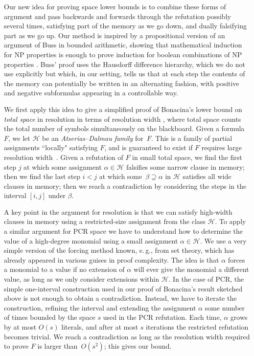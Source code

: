 \documentclass[11pt]{article}
\numberwithin{equation}{section}
\theoremstyle{definition}
\theoremstyle{plain}
\newcommand{\eg}{e.\,g.}
\newcommand\calH{\mathcal{H}}
\begin{document}
Our new idea for proving space lower bounds is to combine 
these forms of argument and
pass backwards and forwards through the refutation possibly several 
times, 
satisfying part of the memory as we go down, and dually falsifying part as we go up.  
Our method is inspired by a propositional version of  an argument of Buss in bounded arithmetic,
showing that mathematical induction for NP properties is enough  to prove induction for boolean combinations of 
NP properties \cite[Corollary~4]{Buss90}. Buss' proof uses the Hausdorff difference hierarchy, 
which we do not use explicitly but which, in our setting, tells us that at each step the contents
of the memory can potentially be written in an alternating fashion, with positive and negative
subformulas appearing in a controllable way.

We first apply this idea to give a simplified proof of Bonacina's lower bound on \emph{total space} 
in resolution in terms of resolution width
\cite{DBLP:conf/icalp/Bonacina16,DBLP:journals/siamcomp/BonacinaGT16},
where total space counts the total number of symbols simultaneously on the blackboard.
Given a formula $F$, we let $\calH$ be
an \emph{Atserias--Dalmau family} for~$F$. 
This is a family of partial assignments ``locally" satisfying $F$, 
and is guaranteed to exist if $F$ requires large resolution width~\cite{DBLP:journals/jcss/AtseriasD08}.
Given a refutation of $F$ in small total space, we find the first step $j$ at which some assignment $\alpha \in \calH$ falsifies some narrow
clause in memory; then we find the last step $i<j$ at which some~$\beta \supseteq \alpha$ in $\calH$
satisfies all wide clauses in memory; then we reach a contradiction by considering the steps in
the interval $[i,j]$ under $\beta$.

A key point in the argument for resolution is that we can satisfy high-width clauses in memory using a restricted-size assignment from the class $\calH$.  
To apply a similar argument for PCR space we  have to understand how to determine
the value of a high-degree monomial using a small assignment $\alpha \in \calH$.
We use a very simple version of the forcing method known, \eg, from set theory, 
which has already appeared in various guises in proof complexity.
The idea is that $\alpha$ forces a monomial to a value if
no extension of $\alpha$ will ever give the monomial 
a different value, as long as we only consider extensions within $\calH$. 
In the case of PCR, the simple one-interval construction used in our proof of Bonacina's result sketched above
is not enough to obtain a contradiction.
Instead, we have to iterate the construction, refining the interval and extending the assignment $\alpha$
some number of times bounded by the space $s$ used in the PCR refutation. 
Each time, $\alpha$ grows by at most $O(s)$ literals, and after at most $s$ iterations the restricted refutation becomes trivial.
We reach a contradiction as long as the resolution width required to prove $F$ is larger than~$O(s^2)$; this gives our bound.
\end{document}
